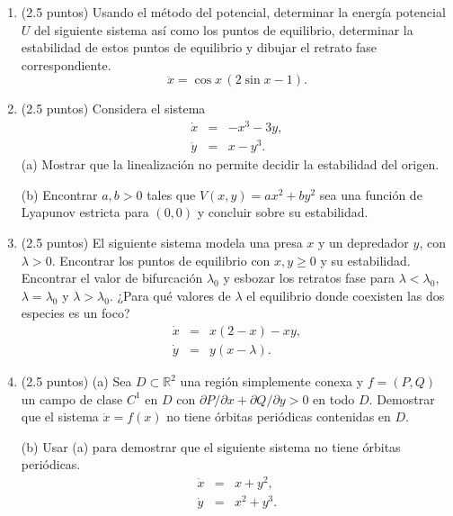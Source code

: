 \documentclass[11pt]{article}
\begin{document}
\begin{enumerate}
\item (2.5 puntos) Usando el método del potencial, determinar la energía potencial $U$ del siguiente sistema así como los puntos de equilibrio, determinar la estabilidad de estos puntos de equilibrio y dibujar el retrato fase correspondiente.
$$\ddot x=\cos x\,(2\sin x-1).$$
\vspace{0.15cm}

\item (2.5 puntos) Considera el sistema
\begin{eqnarray*}
\dot x &=& -x^3-3y, \\
\dot y &=& x-y^3.
\end{eqnarray*}
(a) Mostrar que la linealización no permite decidir la estabilidad del origen.

(b) Encontrar $a,b>0$ tales que $V(x,y)=ax^2+by^2$ sea una función de Lyapunov estricta para $(0,0)$ y concluir sobre su estabilidad.
\vspace{0.15cm}

\item (2.5 puntos) El siguiente sistema modela una presa $x$ y un depredador $y$, con $\lambda>0$. Encontrar los puntos de equilibrio con $x,y\ge0$ y su estabilidad. Encontrar el valor de bifurcación $\lambda_0$ y esbozar los retratos fase para $\lambda<\lambda_0$, $\lambda=\lambda_0$ y $\lambda>\lambda_0$. ¿Para qué valores de $\lambda$ el equilibrio donde coexisten las dos especies es un foco?
\begin{eqnarray*}
\dot x &=& x(2-x)-xy, \\
\dot y &=& y(x-\lambda).
\end{eqnarray*}
\vspace{0.15cm}

\item (2.5 puntos) (a) Sea $D\subset\mathbb{R}^2$ una región simplemente conexa y $f=(P,Q)$ un campo de clase $C^1$ en $D$ con $\partial P/\partial x+\partial Q/\partial y>0$ en todo $D$. Demostrar que el sistema $\dot x=f(x)$ no tiene órbitas periódicas contenidas en $D$.

(b) Usar (a) para demostrar que el siguiente sistema no tiene órbitas periódicas.
\begin{eqnarray*}
\dot x &=& x+y^2, \\
\dot y &=& x^2+y^3.
\end{eqnarray*}
\vspace{0.15cm}

\end{enumerate}
\end{document}

